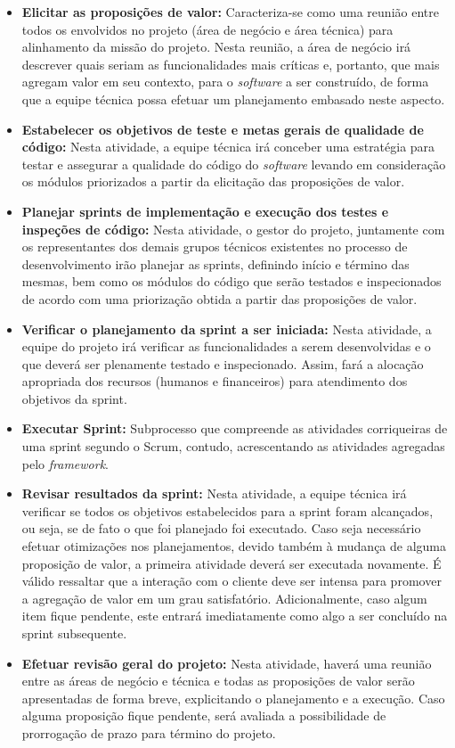 \begin{itemize}
	\item \textbf{Elicitar as proposições de valor:} Caracteriza-se como uma reunião entre todos os envolvidos no projeto (área de negócio e área técnica) para alinhamento da missão do projeto. Nesta reunião, a área de negócio irá descrever quais seriam as funcionalidades mais críticas e, portanto, que mais agregam valor em seu contexto, para o \textit{software} a ser construído, de forma que a equipe técnica possa efetuar um planejamento embasado neste aspecto.

	\item \textbf{Estabelecer os objetivos de teste e metas gerais de qualidade de código:} Nesta atividade, a equipe técnica irá conceber uma estratégia para testar e assegurar a qualidade do código do \textit{software} levando em consideração os módulos priorizados a partir da elicitação das proposições de valor.

	\item \textbf{Planejar sprints de implementação e execução dos testes e inspeções de código:} Nesta atividade, o gestor do projeto, juntamente com os representantes dos demais grupos técnicos existentes no processo de desenvolvimento irão planejar as sprints, definindo início e término das mesmas, bem como os módulos do código que serão testados e inspecionados de acordo com uma priorização obtida a partir das proposições de valor.

	\item \textbf{Verificar o planejamento da sprint a ser iniciada:} Nesta atividade, a equipe do projeto irá verificar as funcionalidades a serem desenvolvidas e o que deverá ser plenamente testado e inspecionado. Assim, fará a alocação apropriada dos recursos (humanos e financeiros) para atendimento dos objetivos da sprint.

	\item \textbf{Executar Sprint:} Subprocesso que compreende as atividades corriqueiras de uma sprint segundo o Scrum, contudo, acrescentando as atividades agregadas pelo \textit{framework}.

	\item \textbf{Revisar resultados da sprint:} Nesta atividade, a equipe técnica irá verificar se todos os objetivos estabelecidos para a sprint foram alcançados, ou seja, se de fato o que foi planejado foi executado. Caso seja necessário efetuar otimizações nos planejamentos, devido também à mudança de alguma proposição de valor, a primeira atividade deverá ser executada novamente. É válido ressaltar que a interação com o cliente deve ser intensa para promover a agregação de valor em um grau satisfatório. Adicionalmente, caso algum item fique pendente, este entrará imediatamente como algo a ser concluído na sprint subsequente.

	\item \textbf{Efetuar revisão geral do projeto:} Nesta atividade, haverá uma reunião entre as áreas de negócio e técnica e todas as proposições de valor serão apresentadas de forma breve, explicitando o planejamento e a execução. Caso alguma proposição fique pendente, será avaliada a possibilidade de prorrogação de prazo para término do projeto.
\end{itemize}

